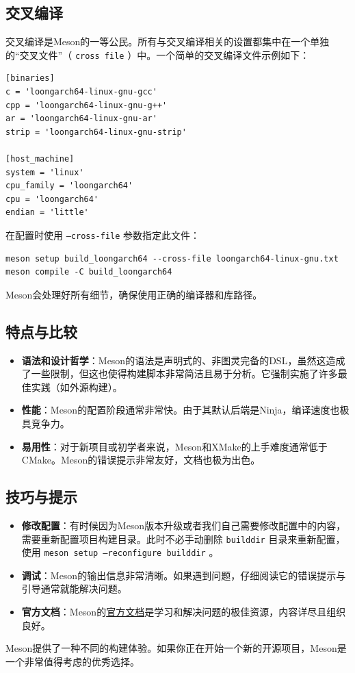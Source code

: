 \subsection{交叉编译}
交叉编译是Meson的一等公民。所有与交叉编译相关的设置都集中在一个单独的“交叉文件”（ \texttt{cross file} ）中。一个简单的交叉编译文件示例如下：
\begin{verbatim}
[binaries]
c = 'loongarch64-linux-gnu-gcc'
cpp = 'loongarch64-linux-gnu-g++'
ar = 'loongarch64-linux-gnu-ar'
strip = 'loongarch64-linux-gnu-strip'

[host_machine]
system = 'linux'
cpu_family = 'loongarch64'
cpu = 'loongarch64'
endian = 'little'
\end{verbatim}

在配置时使用 \texttt{--cross-file} 参数指定此文件：
\begin{verbatim}
meson setup build_loongarch64 --cross-file loongarch64-linux-gnu.txt
meson compile -C build_loongarch64
\end{verbatim}
Meson会处理好所有细节，确保使用正确的编译器和库路径。

\subsection{特点与比较}
\begin{itemize}
    \item \textbf{语法和设计哲学}：Meson的语法是声明式的、非图灵完备的DSL，虽然这造成了一些限制，但这也使得构建脚本非常简洁且易于分析。它强制实施了许多最佳实践（如外源构建）。
    \item \textbf{性能}：Meson的配置阶段通常非常快。由于其默认后端是Ninja，编译速度也极具竞争力。
    \item \textbf{易用性}：对于新项目或初学者来说，Meson和XMake的上手难度通常低于CMake。Meson的错误提示非常友好，文档也极为出色。
\end{itemize}

\subsection{技巧与提示}
\begin{itemize}
    \item \textbf{修改配置}：有时候因为Meson版本升级或者我们自己需要修改配置中的内容，需要重新配置项目构建目录。此时不必手动删除 \texttt{builddir} 目录来重新配置，使用 \texttt{meson setup --reconfigure builddir} 。
    \item \textbf{调试}：Meson的输出信息非常清晰。如果遇到问题，仔细阅读它的错误提示与引导通常就能解决问题。
    \item \textbf{官方文档}：Meson的\href{https://mesonbuild.com/}{官方文档}是学习和解决问题的极佳资源，内容详尽且组织良好。
\end{itemize}

Meson提供了一种不同的构建体验。如果你正在开始一个新的开源项目，Meson是一个非常值得考虑的优秀选择。
